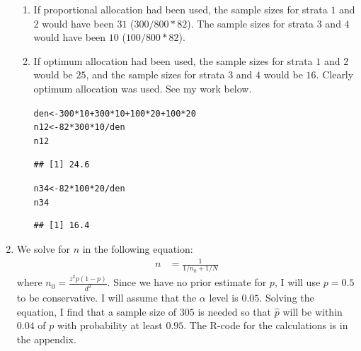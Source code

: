 \documentclass[12pt]{article}\usepackage[]{graphicx}\usepackage[]{color}
\makeatletter
\newcommand{\hlnum}[1]{\textcolor[rgb]{0.686,0.059,0.569}{#1}}%
\newcommand{\hlopt}[1]{\textcolor[rgb]{0,0,0}{#1}}%
\newcommand{\hlstd}[1]{\textcolor[rgb]{0.345,0.345,0.345}{#1}}%
\newcommand{\hlkwb}[1]{\textcolor[rgb]{0.69,0.353,0.396}{#1}}%
\newenvironment{kframe}{%
 \def\at@end@of@kframe{}%
 \ifinner\ifhmode%
  \def\at@end@of@kframe{\end{minipage}}%
  \begin{minipage}{\columnwidth}%
 \fi\fi%
 \def\FrameCommand##1{\hskip\@totalleftmargin \hskip-\fboxsep
 \colorbox{shadecolor}{##1}\hskip-\fboxsep
     \hskip-\linewidth \hskip-\@totalleftmargin \hskip\columnwidth}%
 \MakeFramed {\advance\hsize-\width
   \@totalleftmargin\z@ \linewidth\hsize
   \@setminipage}}%
 {\par\unskip\endMakeFramed%
 \at@end@of@kframe}
\newenvironment{knitrout}{}{} %
\makeatother
\begin{document}
\begin{doublespacing}
\begin{enumerate}
\begin{enumerate}
\item If proportional allocation had been used, the sample sizes for strata $1$ and $2$ would have been $31$ ($300/800*82$). The sample sizes for strata $3$ and $4$ would have been $10$ ($100/800*82$). 

\item If optimum allocation had been used, the sample sizes for strata $1$ and $2$ would be $25$, and the sample sizes for strata $3$ and $4$ would be $16$. Clearly optimum allocation was used. See my work below.

\begin{singlespace}
\begin{knitrout}\footnotesize
{}\color{fgcolor}\begin{kframe}
\begin{alltt}
\hlstd{den} \hlkwb{<-} \hlnum{300}\hlopt{*}\hlnum{10}\hlopt{+}\hlnum{300}\hlopt{*}\hlnum{10}\hlopt{+}\hlnum{100}\hlopt{*}\hlnum{20}\hlopt{+}\hlnum{100}\hlopt{*}\hlnum{20}
\hlstd{n12} \hlkwb{<-} \hlnum{82}\hlopt{*}\hlnum{300}\hlopt{*}\hlnum{10}\hlopt{/}\hlstd{den}
\hlstd{n12}
\end{alltt}
\begin{verbatim}
## [1] 24.6
\end{verbatim}
\begin{alltt}
\hlstd{n34} \hlkwb{<-} \hlnum{82}\hlopt{*}\hlnum{100}\hlopt{*}\hlnum{20}\hlopt{/}\hlstd{den}
\hlstd{n34}
\end{alltt}
\begin{verbatim}
## [1] 16.4
\end{verbatim}
\end{kframe}
\end{knitrout}
\end{singlespace}

\end{enumerate}

\item We solve for $n$ in the following equation:
\begin{align*}
n &= \frac{1}{1/n_0+1/N}
\end{align*}
where $n_0 = \frac{z^2p(1-p)}{d^2}$. Since we have no prior estimate for $p$, I will use $p=0.5$ to be conservative. I will assume that the $\alpha$ level is $0.05$. Solving the equation, I find that a sample size of $305$ is needed so that $\hat{p}$ will be within $0.04$ of $p$ with probability at least $0.95$. The R-code for the calculations is in the appendix.



\end{enumerate}
\end{doublespacing}
\end{document}
